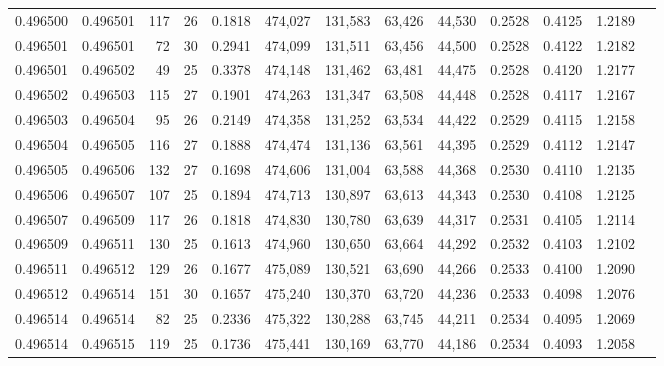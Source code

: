 \begin{tabular}{rrrrrrrrrrrrr}
0.496500 & 0.496501 & 117 &  26 &                                     0.1818 & 474,027 & 131,583 &  63,426 &  44,530 & 0.2528 & 0.4125 & 1.2189 \\
0.496501 & 0.496501 &  72 &  30 &                                     0.2941 & 474,099 & 131,511 &  63,456 &  44,500 & 0.2528 & 0.4122 & 1.2182 \\
0.496501 & 0.496502 &  49 &  25 &                                     0.3378 & 474,148 & 131,462 &  63,481 &  44,475 & 0.2528 & 0.4120 & 1.2177 \\
0.496502 & 0.496503 & 115 &  27 &                                     0.1901 & 474,263 & 131,347 &  63,508 &  44,448 & 0.2528 & 0.4117 & 1.2167 \\
0.496503 & 0.496504 &  95 &  26 &                                     0.2149 & 474,358 & 131,252 &  63,534 &  44,422 & 0.2529 & 0.4115 & 1.2158 \\
0.496504 & 0.496505 & 116 &  27 &                                     0.1888 & 474,474 & 131,136 &  63,561 &  44,395 & 0.2529 & 0.4112 & 1.2147 \\
0.496505 & 0.496506 & 132 &  27 &                                     0.1698 & 474,606 & 131,004 &  63,588 &  44,368 & 0.2530 & 0.4110 & 1.2135 \\
0.496506 & 0.496507 & 107 &  25 &                                     0.1894 & 474,713 & 130,897 &  63,613 &  44,343 & 0.2530 & 0.4108 & 1.2125 \\
0.496507 & 0.496509 & 117 &  26 &                                     0.1818 & 474,830 & 130,780 &  63,639 &  44,317 & 0.2531 & 0.4105 & 1.2114 \\
0.496509 & 0.496511 & 130 &  25 &                                     0.1613 & 474,960 & 130,650 &  63,664 &  44,292 & 0.2532 & 0.4103 & 1.2102 \\
0.496511 & 0.496512 & 129 &  26 &                                     0.1677 & 475,089 & 130,521 &  63,690 &  44,266 & 0.2533 & 0.4100 & 1.2090 \\
0.496512 & 0.496514 & 151 &  30 &                                     0.1657 & 475,240 & 130,370 &  63,720 &  44,236 & 0.2533 & 0.4098 & 1.2076 \\
0.496514 & 0.496514 &  82 &  25 &                                     0.2336 & 475,322 & 130,288 &  63,745 &  44,211 & 0.2534 & 0.4095 & 1.2069 \\
0.496514 & 0.496515 & 119 &  25 &                                     0.1736 & 475,441 & 130,169 &  63,770 &  44,186 & 0.2534 & 0.4093 & 1.2058 \\

\end{tabular}
